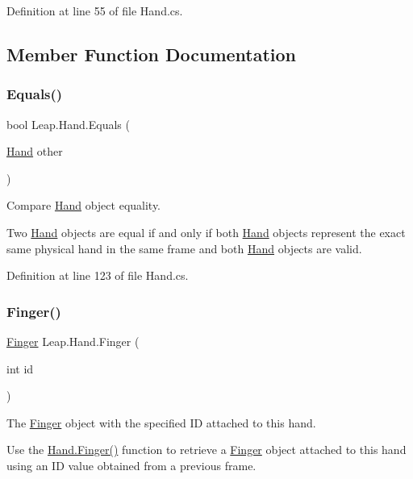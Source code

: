 Definition at line 55 of file Hand.\+cs.



\subsection{Member Function Documentation}
\mbox{\label{class_leap_1_1_hand_aeebe260489e221f30611d12e850200f4}} 
\subsubsection{\texorpdfstring{Equals()}{Equals()}}
{\footnotesize\ttfamily bool Leap.\+Hand.\+Equals (\begin{DoxyParamCaption}\item[{\mbox{\hyperlink{class_leap_1_1_hand}{Hand}}}]{other }\end{DoxyParamCaption})}



Compare \mbox{\hyperlink{class_leap_1_1_hand}{Hand}} object equality. 

Two \mbox{\hyperlink{class_leap_1_1_hand}{Hand}} objects are equal if and only if both \mbox{\hyperlink{class_leap_1_1_hand}{Hand}} objects represent the exact same physical hand in the same frame and both \mbox{\hyperlink{class_leap_1_1_hand}{Hand}} objects are valid. 

Definition at line 123 of file Hand.\+cs.

\mbox{\label{class_leap_1_1_hand_a34ce0ba3c66bc5a83dabbd10341da536}} 
\subsubsection{\texorpdfstring{Finger()}{Finger()}}
{\footnotesize\ttfamily \mbox{\hyperlink{class_leap_1_1_finger}{Finger}} Leap.\+Hand.\+Finger (\begin{DoxyParamCaption}\item[{int}]{id }\end{DoxyParamCaption})}



The \mbox{\hyperlink{class_leap_1_1_finger}{Finger}} object with the specified ID attached to this hand. 

Use the \mbox{\hyperlink{class_leap_1_1_hand_a34ce0ba3c66bc5a83dabbd10341da536}{Hand.\+Finger()}} function to retrieve a \mbox{\hyperlink{class_leap_1_1_finger}{Finger}} object attached to this hand using an ID value obtained from a previous frame.

